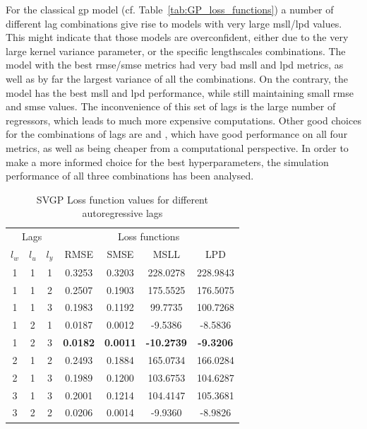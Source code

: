 For the classical \acrshort{gp} model (cf. Table~\ref{tab:GP_loss_functions}) a
number of different lag combinations give rise to models with very large
\acrshort{msll}/\acrshort{lpd} values. This might indicate that those models are
overconfident, either due to the very large kernel variance parameter, or the
specific lengthscales combinations. The model with the best
\acrshort{rmse}/\acrshort{smse} metrics  had very bad
\acrshort{msll} and \acrshort{lpd} metrics, as well as by far the largest
variance of all the combinations. On the contrary, the  model has
the best \acrshort{msll} and \acrshort{lpd} performance, while still maintaining
small \acrshort{rmse} and \acrshort{smse} values. The inconvenience of this set
of lags is the large number of regressors, which leads to much more expensive
computations. Other good choices for the combinations of lags are
 and , which have good performance on all four
metrics, as well as being cheaper from a computational perspective. In order to
make a more informed choice for the best hyperparameters, the simulation
performance of all three combinations has been analysed.

\begin{table}[ht]
\centering
    \begin{tabular}{||c c c|c c c c||}
        \hline
        \multicolumn{3}{||c|}{Lags} & \multicolumn{4}{c||}{Loss functions}\\
        $l_w$ & $l_u$ & $l_y$ & RMSE & SMSE & MSLL & LPD\\
        \hline \hline
        1 & 1 & 1 & 0.3253 & 0.3203 & 228.0278 & 228.9843 \\
        1 & 1 & 2 & 0.2507 & 0.1903 & 175.5525 & 176.5075 \\
        1 & 1 & 3 & 0.1983 & 0.1192 & 99.7735 & 100.7268 \\
        1 & 2 & 1 & 0.0187 & 0.0012 & -9.5386 & -8.5836 \\
        1 & 2 & 3 & \textbf{0.0182} & \textbf{0.0011} & \textbf{-10.2739} &
        \textbf{-9.3206} \\
        2 & 1 & 2 & 0.2493 & 0.1884 & 165.0734 & 166.0284 \\
        2 & 1 & 3 & 0.1989 & 0.1200 & 103.6753 & 104.6287 \\
        3 & 1 & 3 & 0.2001 & 0.1214 & 104.4147 & 105.3681 \\
        3 & 2 & 2 & 0.0206 & 0.0014 & -9.9360 & -8.9826 \\
        \hline
    \end{tabular}
\caption{SVGP Loss function values for different autoregressive lags}
\label{tab:SVGP_loss_functions}
\end{table}

